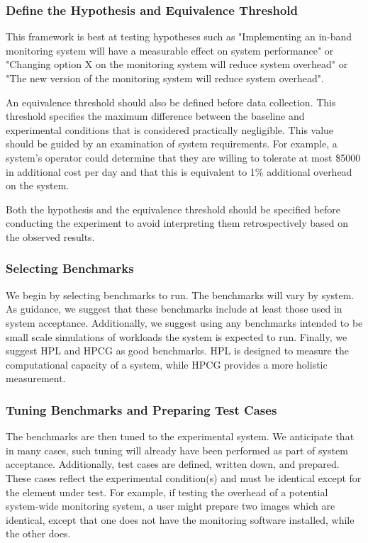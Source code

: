 \documentclass[conference]{IEEEtran}
\begin{document}
\subsubsection{Define the Hypothesis and Equivalence Threshold}

This framework is best at testing hypotheses such as "Implementing an in-band 
monitoring system will have a measurable effect on system performance" or 
"Changing option X on the monitoring system will reduce system overhead" or 
"The new version of the monitoring system will reduce system overhead".

An equivalence threshold should also be defined before data collection.
This threshold specifies the maximum difference between the baseline and experimental 
conditions that is considered practically negligible. This value should be guided by
an examination of system requirements. For example, a system's operator could determine
that they are willing to tolerate at most \$5000 in additional cost per day and
that this is equivalent to 1\% additional overhead on the system.

Both the hypothesis and the equivalence threshold should be specified before 
conducting the experiment to avoid interpreting them retrospectively based on the 
observed results.

\subsubsection{Selecting Benchmarks}
We begin by selecting benchmarks to run. The benchmarks will vary by system. 
As guidance, we suggest that 
these benchmarks include at least those used in system acceptance. Additionally, 
we suggest using any benchmarks intended to be small scale simulations of 
workloads the system is expected to run.
Finally, we suggest HPL\cite{dongarraLINPACKBenchmarkPresent2003} and 
HPCG\cite{herouxNewMetricRanking2013} as good benchmarks. HPL is designed to 
measure the computational capacity of a system, while HPCG provides a 
more holistic measurement.

\subsubsection{Tuning Benchmarks and Preparing Test Cases}

The benchmarks are then tuned to the experimental system. 
We anticipate that in many cases, such tuning will already have 
been performed as part of system acceptance. 
Additionally, test cases are defined, written down, and prepared. These cases 
reflect the experimental 
condition(s) and must be identical except for the element under test.
For example, if testing the overhead of a potential system-wide monitoring system,
a user might prepare two images which are identical, except that one does not have the
monitoring software installed, while the other does.
\end{document}

